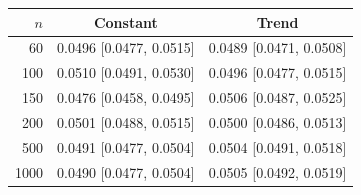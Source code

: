 \begin{tabular}{rcc}
\toprule
$n$ & Constant & Trend \\
\midrule
60 & 0.0496 [0.0477, 0.0515] & 0.0489 [0.0471, 0.0508] \\
100 & 0.0510 [0.0491, 0.0530] & 0.0496 [0.0477, 0.0515] \\
150 & 0.0476 [0.0458, 0.0495] & 0.0506 [0.0487, 0.0525] \\
200 & 0.0501 [0.0488, 0.0515] & 0.0500 [0.0486, 0.0513] \\
500 & 0.0491 [0.0477, 0.0504] & 0.0504 [0.0491, 0.0518] \\
1000 & 0.0490 [0.0477, 0.0504] & 0.0505 [0.0492, 0.0519] \\
\bottomrule
\end{tabular}
